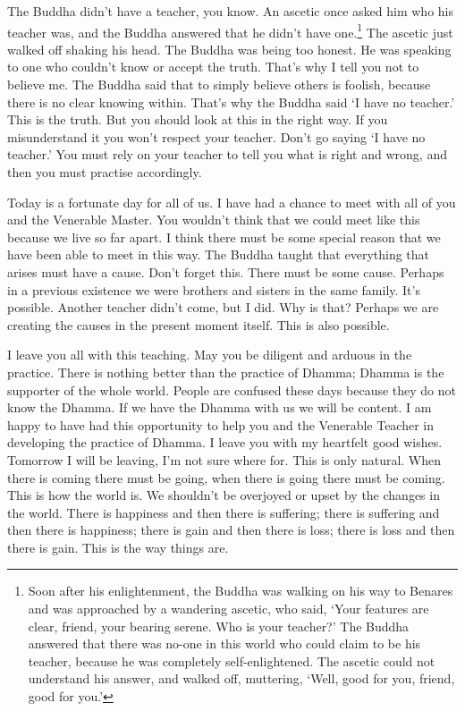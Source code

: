The Buddha didn't have a teacher, you know. An ascetic once asked him who his teacher was, and the Buddha answered that he didn't have one.\footnote{Soon after his enlightenment, the Buddha was walking on his way to Benares and was approached by a wandering ascetic, who said, `Your features are clear, friend, your bearing serene. Who is your teacher?' The Buddha answered that there was no-one in this world who could claim to be his teacher, because he was completely self-enlightened. The ascetic could not understand his answer, and walked off, muttering, `Well, good for you, friend, good for you.'} The ascetic just walked off shaking his head. The Buddha was being too honest. He was speaking to one who couldn't know or accept the truth. That's why I tell you not to believe me. The Buddha said that to simply believe others is foolish, because there is no clear knowing within. That's why the Buddha said `I have no teacher.' This is the truth. But you should look at this in the right way. If you misunderstand it you won't respect your teacher. Don't go saying `I have no teacher.' You must rely on your teacher to tell you what is right and wrong, and then you must practise accordingly. 

Today is a fortunate day for all of us. I have had a chance to meet with all of you and the Venerable Master. You wouldn't think that we could meet like this because we live so far apart. I think there must be some special reason that we have been able to meet in this way. The Buddha taught that everything that arises must have a cause. Don't forget this. There must be some cause. Perhaps in a previous existence we were brothers and sisters in the same family. It's possible. Another teacher didn't come, but I did. Why is that? Perhaps we are creating the causes in the present moment itself. This is also possible. 

I leave you all with this teaching. May you be diligent and arduous in the practice. There is nothing better than the practice of Dhamma; Dhamma is the supporter of the whole world. People are confused these days because they do not know the Dhamma. If we have the Dhamma with us we will be content. I am happy to have had this opportunity to help you and the Venerable Teacher in developing the practice of Dhamma. I leave you with my heartfelt good wishes. Tomorrow I will be leaving, I'm not sure where for. This is only natural. When there is coming there must be going, when there is going there must be coming. This is how the world is. We shouldn't be overjoyed or upset by the changes in the world. There is happiness and then there is suffering; there is suffering and then there is happiness; there is gain and then there is loss; there is loss and then there is gain. This is the way things are. 


